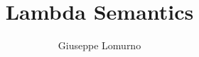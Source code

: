 \documentclass[a4paper]{scrreprt}
\begin{document}
\author{Giuseppe Lomurno}
\title{Lambda Semantics}
\date{}
\maketitle



%
\end{document}
